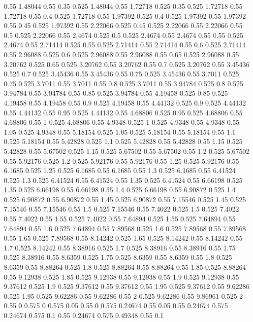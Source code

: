 0.55 1.48044
0.55 0.35
0.525 1.48044
0.55 1.72718
0.525 0.35
0.525 1.72718
0.55 1.72718
0.55 0.4
0.525 1.72718
0.55 1.97392
0.525 0.4
0.525 1.97392
0.55 1.97392
0.55 0.45
0.525 1.97392
0.55 2.22066
0.525 0.45
0.525 2.22066
0.55 2.22066
0.55 0.5
0.525 2.22066
0.55 2.4674
0.525 0.5
0.525 2.4674
0.55 2.4674
0.55 0.55
0.525 2.4674
0.55 2.71414
0.525 0.55
0.525 2.71414
0.55 2.71414
0.55 0.6
0.525 2.71414
0.55 2.96088
0.525 0.6
0.525 2.96088
0.55 2.96088
0.55 0.65
0.525 2.96088
0.55 3.20762
0.525 0.65
0.525 3.20762
0.55 3.20762
0.55 0.7
0.525 3.20762
0.55 3.45436
0.525 0.7
0.525 3.45436
0.55 3.45436
0.55 0.75
0.525 3.45436
0.55 3.7011
0.525 0.75
0.525 3.7011
0.55 3.7011
0.55 0.8
0.525 3.7011
0.55 3.94784
0.525 0.8
0.525 3.94784
0.55 3.94784
0.55 0.85
0.525 3.94784
0.55 4.19458
0.525 0.85
0.525 4.19458
0.55 4.19458
0.55 0.9
0.525 4.19458
0.55 4.44132
0.525 0.9
0.525 4.44132
0.55 4.44132
0.55 0.95
0.525 4.44132
0.55 4.68806
0.525 0.95
0.525 4.68806
0.55 4.68806
0.55 1
0.525 4.68806
0.55 4.9348
0.525 1
0.525 4.9348
0.55 4.9348
0.55 1.05
0.525 4.9348
0.55 5.18154
0.525 1.05
0.525 5.18154
0.55 5.18154
0.55 1.1
0.525 5.18154
0.55 5.42828
0.525 1.1
0.525 5.42828
0.55 5.42828
0.55 1.15
0.525 5.42828
0.55 5.67502
0.525 1.15
0.525 5.67502
0.55 5.67502
0.55 1.2
0.525 5.67502
0.55 5.92176
0.525 1.2
0.525 5.92176
0.55 5.92176
0.55 1.25
0.525 5.92176
0.55 6.1685
0.525 1.25
0.525 6.1685
0.55 6.1685
0.55 1.3
0.525 6.1685
0.55 6.41524
0.525 1.3
0.525 6.41524
0.55 6.41524
0.55 1.35
0.525 6.41524
0.55 6.66198
0.525 1.35
0.525 6.66198
0.55 6.66198
0.55 1.4
0.525 6.66198
0.55 6.90872
0.525 1.4
0.525 6.90872
0.55 6.90872
0.55 1.45
0.525 6.90872
0.55 7.15546
0.525 1.45
0.525 7.15546
0.55 7.15546
0.55 1.5
0.525 7.15546
0.55 7.4022
0.525 1.5
0.525 7.4022
0.55 7.4022
0.55 1.55
0.525 7.4022
0.55 7.64894
0.525 1.55
0.525 7.64894
0.55 7.64894
0.55 1.6
0.525 7.64894
0.55 7.89568
0.525 1.6
0.525 7.89568
0.55 7.89568
0.55 1.65
0.525 7.89568
0.55 8.14242
0.525 1.65
0.525 8.14242
0.55 8.14242
0.55 1.7
0.525 8.14242
0.55 8.38916
0.525 1.7
0.525 8.38916
0.55 8.38916
0.55 1.75
0.525 8.38916
0.55 8.6359
0.525 1.75
0.525 8.6359
0.55 8.6359
0.55 1.8
0.525 8.6359
0.55 8.88264
0.525 1.8
0.525 8.88264
0.55 8.88264
0.55 1.85
0.525 8.88264
0.55 9.12938
0.525 1.85
0.525 9.12938
0.55 9.12938
0.55 1.9
0.525 9.12938
0.55 9.37612
0.525 1.9
0.525 9.37612
0.55 9.37612
0.55 1.95
0.525 9.37612
0.55 9.62286
0.525 1.95
0.525 9.62286
0.55 9.62286
0.55 2
0.525 9.62286
0.55 9.86961
0.525 2
0.55 0
0.575 0
0.575 0.05
0.55 0
0.575 0.24674
0.55 0.05
0.55 0.24674
0.575 0.24674
0.575 0.1
0.55 0.24674
0.575 0.49348
0.55 0.1
